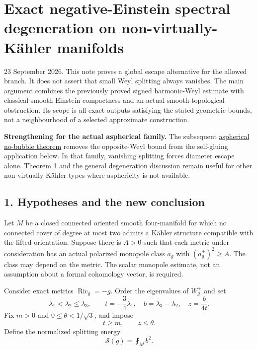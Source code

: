 \documentclass[
  11pt,
]{article}
\author{}
\date{23 September 2026}
\begin{document}
\hypertarget{exact-negative-einstein-spectral-degeneration-on-non-virtually-kuxe4hler-manifolds}{%
\section{Exact negative-Einstein spectral degeneration on
non-virtually-Kähler
manifolds}\label{exact-negative-einstein-spectral-degeneration-on-non-virtually-kuxe4hler-manifolds}}

23 September 2026. This note proves a global escape alternative for the
allowed branch. It does not assert that small Weyl splitting always
vanishes. The main argument combines the previously proved signed
harmonic-Weyl estimate with classical smooth Einstein compactness and an
actual smooth-topological obstruction. Its scope is all exact outputs
satisfying the stated geometric bounds, not a neighbourhood of a
selected approximate construction.

\textbf{Strengthening for the actual aspherical family.} The subsequent
\href{line1_aspherical_no_bubbles.md}{aspherical no-bubble theorem}
removes the opposite-Weyl bound from the self-gluing application below.
In that family, vanishing splitting forces diameter escape alone.
Theorem 1 and the general degeneration discussion remain useful for
other non-virtually-Kähler types where asphericity is not available.

\hypertarget{hypotheses-and-the-new-conclusion}{%
\subsection{1. Hypotheses and the new
conclusion}\label{hypotheses-and-the-new-conclusion}}

Let \(M\) be a closed connected oriented smooth four-manifold for which
no connected cover of degree at most two admits a Kähler structure
compatible with the lifted orientation. Suppose there is \(A>0\) such
that each metric under consideration has an actual polarized monopole
class \(a_g\) with \((a_g^+)^2\ge A\). The class may depend on the
metric. The scalar monopole estimate, not an assumption about a formal
cohomology vector, is required.

Consider exact metrics \(\operatorname{Ric}_g=-g\). Order the
eigenvalues of \(W_g^+\) and set \[
 \lambda_1<\lambda_2\le\lambda_3,\qquad
 t=-\frac34\lambda_1,\quad b=\lambda_3-\lambda_2,\quad
 z=\frac b{4t}.
\] Fix \(m>0\) and \(0\le\theta<1/\sqrt3\), and impose \[
                 t\ge m,\qquad z\le\theta.                 \tag{1}
\] Define the normalized splitting energy \[
                      \mathscr S(g)=\fint_M b^2.
\]
\end{document}
